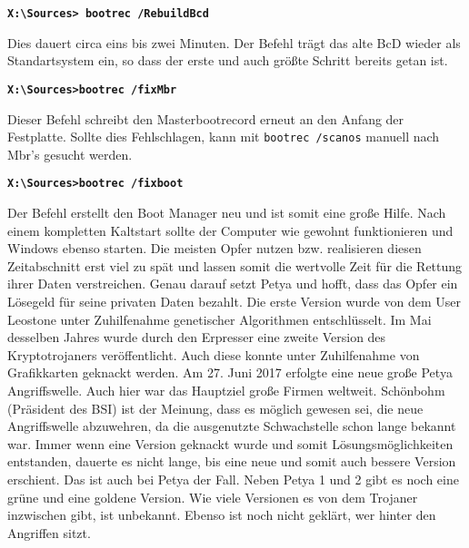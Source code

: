 \begin{center}
	\textbf{\texttt{X:\textbackslash Sources> bootrec /RebuildBcd}}
\end{center}

Dies dauert circa eins bis zwei Minuten. Der Befehl trägt das alte BcD wieder als Standartsystem ein, so dass der erste und auch größte Schritt bereits getan ist.\\

\begin{center}
	\textbf{\texttt{X:\textbackslash Sources>bootrec /fixMbr}}
\end{center}

Dieser Befehl schreibt den Masterbootrecord erneut an den Anfang der Festplatte. Sollte dies Fehlschlagen, kann mit \texttt{bootrec /scanos} manuell nach Mbr’s gesucht werden.



\begin{center}
	\textbf{\texttt{X:\textbackslash Sources>bootrec /fixboot}}
\end{center}

Der Befehl erstellt den Boot Manager neu und ist somit eine große Hilfe. Nach einem kompletten Kaltstart sollte der Computer wie gewohnt funktionieren und Windows ebenso starten. Die meisten Opfer nutzen bzw. realisieren diesen Zeitabschnitt erst viel zu spät und lassen somit die wertvolle Zeit für die Rettung ihrer Daten verstreichen. Genau darauf setzt Petya und hofft, dass das Opfer ein Lösegeld für seine privaten Daten bezahlt. Die erste Version wurde von dem User Leostone unter Zuhilfenahme genetischer Algorithmen entschlüsselt. Im Mai desselben Jahres wurde durch den Erpresser eine zweite Version des Kryptotrojaners veröffentlicht. Auch diese konnte unter Zuhilfenahme von Grafikkarten geknackt werden. Am 27. Juni 2017 erfolgte eine neue große Petya Angriffswelle. Auch hier war das Hauptziel große Firmen weltweit. Schönbohm (Präsident des BSI) ist der Meinung, dass es möglich gewesen sei, die neue Angriffswelle abzuwehren, da die ausgenutzte Schwachstelle schon lange bekannt war. Immer wenn eine Version geknackt wurde und somit Lösungsmöglichkeiten entstanden, dauerte es nicht lange, bis eine neue und somit auch bessere Version erschient. Das ist auch bei Petya der Fall. Neben Petya 1 und 2 gibt es noch eine grüne und eine goldene Version. Wie viele Versionen es von dem Trojaner inzwischen gibt, ist unbekannt. Ebenso ist noch nicht geklärt, wer hinter den Angriffen sitzt.\\

